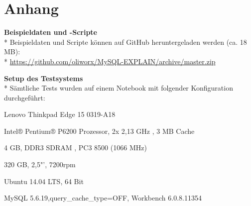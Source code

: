 \newpage
\section*{Anhang}
\textbf{Beispieldaten und -Scripte}\\*
Beispieldaten und Scripte können auf GitHub heruntergeladen werden (ca. 18 MB):\\*
\url{https://github.com/oliworx/MySQL-EXPLAIN/archive/master.zip}

\textbf{Setup des Testsystems}\\*
Sämtliche Tests wurden auf einem Notebook mit folgender Konfiguration durchgeführt:
\begin{description}[labelwidth=60pt]
  \item[Model] Lenovo Thinkpad Edge 15 0319-A18
  \item[CPU] Intel® Pentium® P6200 Prozessor, 2x 2,13 GHz , 3 MB Cache
  \item[RAM] 4 GB, DDR3 SDRAM , PC3 8500 (1066 MHz)
  \item[HDD] 320 GB, 2,5"', 7200rpm
  \item[OS] Ubuntu 14.04 LTS, 64 Bit
  \item[DB] MySQL 5.6.19,query\_cache\_type=OFF, Workbench 6.0.8.11354
\end{description}